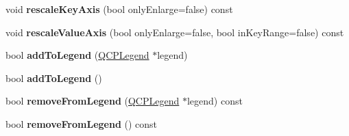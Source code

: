 \begin{DoxyCompactItemize}
void {\bfseries rescale\+Key\+Axis} (bool only\+Enlarge=false) const
\item 
\mbox{\label{class_q_c_p_abstract_plottable_a714eaf36b12434cd71846215504db82e}} 
void {\bfseries rescale\+Value\+Axis} (bool only\+Enlarge=false, bool in\+Key\+Range=false) const
\item 
\mbox{\label{class_q_c_p_abstract_plottable_aa64e93cb5b606d8110d2cc0a349bb30f}} 
bool {\bfseries add\+To\+Legend} (\hyperlink{class_q_c_p_legend}{Q\+C\+P\+Legend} $\ast$legend)
\item 
\mbox{\label{class_q_c_p_abstract_plottable_a70f8cabfd808f7d5204b9f18c45c13f5}} 
bool {\bfseries add\+To\+Legend} ()
\item 
\mbox{\label{class_q_c_p_abstract_plottable_a3cc235007e2343a65ad4f463767e0e20}} 
bool {\bfseries remove\+From\+Legend} (\hyperlink{class_q_c_p_legend}{Q\+C\+P\+Legend} $\ast$legend) const
\item 
\mbox{\label{class_q_c_p_abstract_plottable_ac95fb2604d9106d0852ad9ceb326fe8c}} 
bool {\bfseries remove\+From\+Legend} () const
\end{DoxyCompactItemize}
